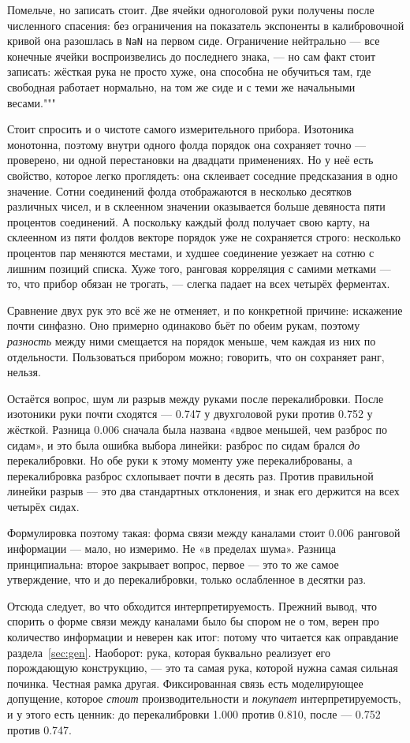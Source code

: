 Помельче, но записать стоит. Две ячейки одноголовой руки получены после численного спасения: без ограничения на показатель экспоненты в калибровочной кривой она разошлась в
\texttt{NaN} на первом сиде. Ограничение нейтрально --- все конечные ячейки воспроизвелись до
последнего знака, --- но сам факт стоит записать: жёсткая рука не просто хуже, она способна
не обучиться там, где свободная работает нормально, на том же сиде и с теми же начальными
весами."""

Стоит спросить и о чистоте самого измерительного прибора. Изотоника монотонна, поэтому внутри одного
фолда порядок она сохраняет точно --- проверено, ни одной перестановки на двадцати
применениях. Но у неё есть свойство, которое легко проглядеть: она склеивает соседние
предсказания в одно значение. Сотни соединений фолда отображаются в несколько десятков
различных чисел, и в склеенном значении оказывается больше девяноста пяти процентов
соединений. А поскольку каждый фолд получает свою карту, на склеенном из пяти фолдов векторе
порядок уже не сохраняется строго: несколько процентов пар меняются местами, и худшее
соединение уезжает на сотню с лишним позиций списка. Хуже того, ранговая корреляция с самими
метками --- то, что прибор обязан не трогать, --- слегка падает на всех четырёх ферментах.

Сравнение двух рук это всё же не отменяет, и по конкретной причине: искажение почти синфазно.
Оно примерно одинаково бьёт по обеим рукам, поэтому \emph{разность} между ними смещается на
порядок меньше, чем каждая из них по отдельности. Пользоваться прибором можно; говорить, что
он сохраняет ранг, нельзя.

Остаётся вопрос, шум ли разрыв между руками после перекалибровки. После изотоники руки почти
сходятся --- 0.747 у двухголовой руки против 0.752 у жёсткой. Разница 0.006 сначала была
названа «вдвое меньшей, чем разброс по сидам», и это была ошибка выбора линейки: разброс
по сидам брался \emph{до} перекалибровки. Но обе руки к этому моменту уже перекалиброваны,
а перекалибровка разброс схлопывает почти в десять раз. Против правильной линейки разрыв ---
это два стандартных отклонения, и знак его держится на всех четырёх сидах.

Формулировка поэтому такая: форма связи между каналами стоит 0.006 ранговой информации ---
мало, но измеримо. Не «в пределах шума». Разница принципиальна: второе закрывает вопрос,
первое --- это то же самое утверждение, что и до перекалибровки, только ослабленное в
десятки раз.

Отсюда следует, во что обходится интерпретируемость. Прежний вывод, что спорить о форме
связи между каналами было бы спором не о том, верен про количество информации и неверен как
итог:
потому что читается как оправдание раздела~\ref{sec:gen}. Наоборот: рука, которая буквально
реализует его порождающую конструкцию, --- это та самая рука, которой нужна самая сильная
починка. Честная рамка другая. Фиксированная связь есть моделирующее допущение, которое
\emph{стоит} производительности и \emph{покупает} интерпретируемость, и у этого есть ценник:
до перекалибровки 1.000 против 0.810, после --- 0.752 против 0.747.

